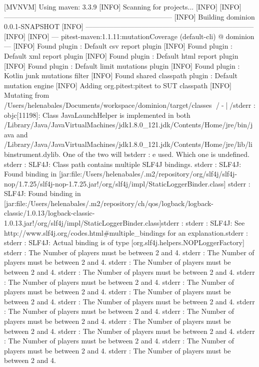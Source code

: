 [MVNVM] Using maven: 3.3.9
[INFO] Scanning for projects...
[INFO]                                                                         
[INFO] ------------------------------------------------------------------------
[INFO] Building dominion 0.0.1-SNAPSHOT
[INFO] ------------------------------------------------------------------------
[INFO] 
[INFO] --- pitest-maven:1.1.11:mutationCoverage (default-cli) @ dominion ---
[INFO] Found plugin : Default csv report plugin
[INFO] Found plugin : Default xml report plugin
[INFO] Found plugin : Default html report plugin
[INFO] Found plugin : Default limit mutations plugin
[INFO] Found plugin : Kotlin junk mutations filter
[INFO] Found shared classpath plugin : Default mutation engine
[INFO] Adding org.pitest:pitest to SUT classpath
[INFO] Mutating from /Users/helenabales/Documents/workspace/dominion/target/classes
/-\|/stderr  : objc[11198]: Class JavaLaunchHelper is implemented in both /Library/Java/JavaVirtualMachines/jdk1.8.0_121.jdk/Contents/Home/jre/bin/java and /Library/Java/JavaVirtualMachines/jdk1.8.0_121.jdk/Contents/Home/jre/lib/libinstrument.dylib. One of the two will bstderr  : e used. Which one is undefined.
stderr  : SLF4J: Class path contains multiple SLF4J bindings.
stderr  : SLF4J: Found binding in [jar:file:/Users/helenabales/.m2/repository/org/slf4j/slf4j-nop/1.7.25/slf4j-nop-1.7.25.jar!/org/slf4j/impl/StaticLoggerBinder.class]
stderr  : SLF4J: Found binding in [jar:file:/Users/helenabales/.m2/repository/ch/qos/logback/logback-classic/1.0.13/logback-classic-1.0.13.jar!/org/slf4j/impl/StaticLoggerBinder.class]stderr  : 
stderr  : SLF4J: See http://www.slf4j.org/codes.html#multiple_bindings for an explanation.stderr  : 
stderr  : SLF4J: Actual binding is of type [org.slf4j.helpers.NOPLoggerFactory]
stderr  : The Number of players must be between 2 and 4.
stderr  : The Number of players must be between 2 and 4.
stderr  : The Number of players must be between 2 and 4.
stderr  : The Number of players must be between 2 and 4.
stderr  : The Number of players must be between 2 and 4.
stderr  : The Number of players must be between 2 and 4.
stderr  : The Number of players must be between 2 and 4.
stderr  : The Number of players must be between 2 and 4.
stderr  : The Number of players must be between 2 and 4.
stderr  : The Number of players must be between 2 and 4.
stderr  : The Number of players must be between 2 and 4.
stderr  : The Number of players must be between 2 and 4.
stderr  : The Number of players must be between 2 and 4.
stderr  : The Number of players must be between 2 and 4.
stderr  : The Number of players must be between 2 and 4.
